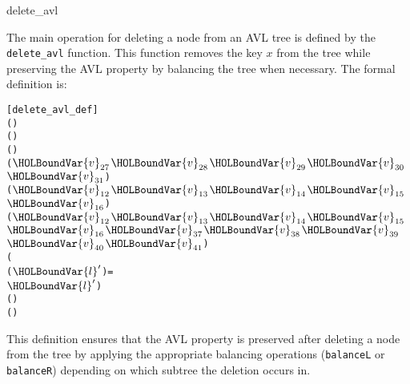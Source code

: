 \begin{defn}{delete\_avl}

The main operation for deleting a node from an AVL tree is defined by the \texttt{delete\_avl} function. This function removes the key \( x \) from the tree while preserving the AVL property by balancing the tree when necessary. The formal definition is:


\begin{alltt}
	[delete_avl_def]
	   \HOLTokenDefEquality{} 
  (     ) \HOLTokenDefEquality{}
    \HOLSymConst{=}  
     (\HOLSymConst{,}) 
      (\HOLSymConst{,}) \HOLTokenImp{} 
    \HOLTokenBar{} (\HOLSymConst{,} \ensuremath{\HOLBoundVar{v}\sb{\mathrm{27}}} \ensuremath{\HOLBoundVar{v}\sb{\mathrm{28}}} \ensuremath{\HOLBoundVar{v}\sb{\mathrm{29}}} \ensuremath{\HOLBoundVar{v}\sb{\mathrm{30}}} \ensuremath{\HOLBoundVar{v}\sb{\mathrm{31}}}) \HOLTokenImp{} 
    \HOLTokenBar{} ( \ensuremath{\HOLBoundVar{v}\sb{\mathrm{12}}} \ensuremath{\HOLBoundVar{v}\sb{\mathrm{13}}} \ensuremath{\HOLBoundVar{v}\sb{\mathrm{14}}} \ensuremath{\HOLBoundVar{v}\sb{\mathrm{15}}} \ensuremath{\HOLBoundVar{v}\sb{\mathrm{16}}}\HOLSymConst{,}) \HOLTokenImp{} 
    \HOLTokenBar{} ( \ensuremath{\HOLBoundVar{v}\sb{\mathrm{12}}} \ensuremath{\HOLBoundVar{v}\sb{\mathrm{13}}} \ensuremath{\HOLBoundVar{v}\sb{\mathrm{14}}} \ensuremath{\HOLBoundVar{v}\sb{\mathrm{15}}} \ensuremath{\HOLBoundVar{v}\sb{\mathrm{16}}}\HOLSymConst{,} \ensuremath{\HOLBoundVar{v}\sb{\mathrm{37}}} \ensuremath{\HOLBoundVar{v}\sb{\mathrm{38}}} \ensuremath{\HOLBoundVar{v}\sb{\mathrm{39}}} \ensuremath{\HOLBoundVar{v}\sb{\mathrm{40}}} \ensuremath{\HOLBoundVar{v}\sb{\mathrm{41}}}) \HOLTokenImp{}
      (
         (\HOLSymConst{,}\HOLSymConst{,}\ensuremath{\HOLBoundVar{l}\sp{\prime{}}}) =  
            \ensuremath{\HOLBoundVar{l}\sp{\prime{}}} )
     \HOLSymConst{\HOLTokenLt{}}      (  ) 
       (  )
\end{alltt}

This definition ensures that the AVL property is preserved after deleting a node from the tree by applying the appropriate balancing operations (\texttt{balanceL} or \texttt{balanceR}) depending on which subtree the deletion occurs in.
\end{defn}


